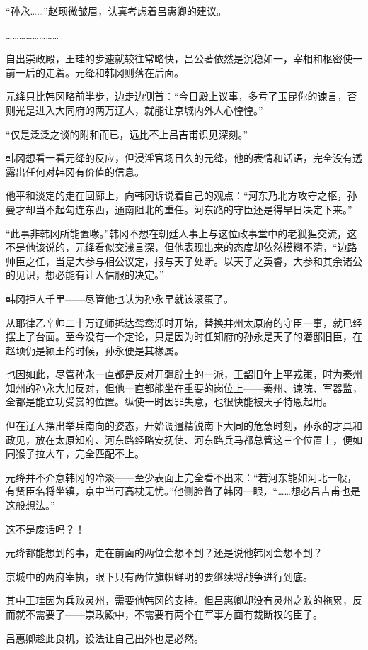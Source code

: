 “孙永……”赵顼微皱眉，认真考虑着吕惠卿的建议。

……………………

自出崇政殿，王珪的步速就较往常略快，吕公著依然是沉稳如一，宰相和枢密使一前一后的走着。元绛和韩冈则落在后面。

元绛只比韩冈略前半步，边走边侧首：“今日殿上议事，多亏了玉昆你的谏言，否则光是进入大同府的两万辽人，就能让京城内外人心惶惶。”

“仅是泛泛之谈的附和而已，远比不上吕吉甫识见深刻。”

韩冈想看一看元绛的反应，但浸淫官场日久的元绛，他的表情和话语，完全没有透露出任何对韩冈有价值的信息。

他平和淡定的走在回廊上，向韩冈诉说着自己的观点：“河东乃北方攻守之枢，孙曼才却当不起勾连东西，通南阻北的重任。河东路的守臣还是得早日决定下来。”

“此事非韩冈所能置喙。”韩冈不想在朝廷人事上与这位政事堂中的老狐狸交流，这不是他该说的，元绛看似交浅言深，但他表现出来的态度却依然模糊不清，“边路帅臣之任，当是大参与相公议定，报与天子处断。以天子之英睿，大参和其余诸公的见识，想必能有让人信服的决定。”

韩冈拒人千里——尽管他也认为孙永早就该滚蛋了。

从耶律乙辛帅二十万辽师抵达鸳鸯泺时开始，替换并州太原府的守臣一事，就已经摆上了台面。至今没有一个定论，只是因为时任知府的孙永是天子的潜邸旧臣，在赵顼仍是颍王的时候，孙永便是其椽属。

也因如此，尽管孙永一直都是反对开疆辟土的一派，王韶旧年上平戎策，时为秦州知州的孙永大加反对，但他一直都能坐在重要的岗位上——秦州、谏院、军器监，全都是能立功受赏的位置。纵使一时因罪失意，也很快能被天子特恩起用。

但在辽人摆出举兵南向的姿态，开始调遣精锐南下大同的危急时刻，孙永的才具和政见，放在太原知府、河东路经略安抚使、河东路兵马都总管这三个位置上，便如同猴子拉大车，完全匹配不上。

元绛并不介意韩冈的冷淡——至少表面上完全看不出来：“若河东能如河北一般，有贤臣名将坐镇，京中当可高枕无忧。”他侧脸瞥了韩冈一眼，“……想必吕吉甫也是这般想法。”

这不是废话吗？！

元绛都能想到的事，走在前面的两位会想不到？还是说他韩冈会想不到？

京城中的两府宰执，眼下只有两位旗帜鲜明的要继续将战争进行到底。

其中王珪因为兵败灵州，需要他韩冈的支持。但吕惠卿却没有灵州之败的拖累，反而就不需要了——崇政殿中，不需要有两个在军事方面有裁断权的臣子。

吕惠卿趁此良机，设法让自己出外也是必然。

